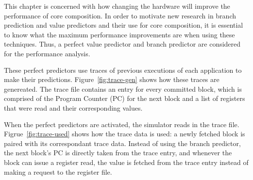 This chapter is concerned with how changing the hardware will improve the performance of core composition.
In order to motivate new research in branch prediction and value predictors and their use for core composition, it is essential to know what the maximum performance improvements are when using these techniques. %
Thus, a perfect value predictor and branch predictor are considered for the performance analysis.

These perfect predictors use traces of previous executions of each application to make their predictions.
Figure~\ref{fig:trace-gen} shows how these traces are genereated.
The trace file contains an entry for every committed block, which is comprised of the Program Counter (PC) for the next block and a list of registers that were read and their corresponding values.

When the perfect predictors are activated, the simulator reads in the trace file.
Figrue~\ref{fig:trace-used} shows how the trace data is used: a newly fetched block is paired with its correspondant trace data.
Instead of using the branch predictor, the next block's PC is directly taken from the trace entry, and whenever the block can issue a register read, the value is fetched from the trace entry instead of making a request to the register file.
\vspace{-2em}